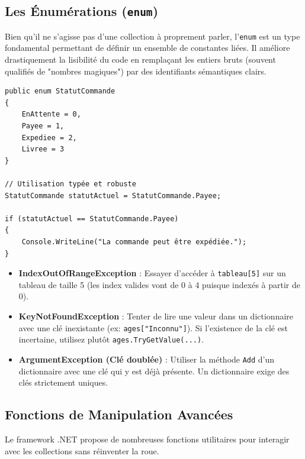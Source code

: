 \subsection{Les Énumérations (\texttt{enum})}
Bien qu'il ne s'agisse pas d'une collection à proprement parler, l'\texttt{enum} est un type fondamental permettant de définir un ensemble de constantes liées. Il améliore drastiquement la lisibilité du code en remplaçant les entiers bruts (souvent qualifiés de "nombres magiques") par des identifiants sémantiques clairs.

\begin{lstlisting}[style=csharpstyle]
public enum StatutCommande
{
    EnAttente = 0,
    Payee = 1,
    Expediee = 2,
    Livree = 3
}

// Utilisation typée et robuste
StatutCommande statutActuel = StatutCommande.Payee;

if (statutActuel == StatutCommande.Payee)
{
    Console.WriteLine("La commande peut être expédiée.");
}
\end{lstlisting}

\begin{tcolorbox}[colback=backcolour,colframe=keywordcolor,title=\textbf{Pièges Courants \& Erreurs}]
\begin{itemize}
    \item \textbf{IndexOutOfRangeException} : Essayer d'accéder à \texttt{tableau[5]} sur un tableau de taille 5 (les index valides vont de 0 à 4 puisque indexés à partir de 0).
    \item \textbf{KeyNotFoundException} : Tenter de lire une valeur dans un dictionnaire avec une clé inexistante (ex: \texttt{ages["Inconnu"]}). Si l'existence de la clé est incertaine, utilisez plutôt \texttt{ages.TryGetValue(...)}.
    \item \textbf{ArgumentException (Clé doublée)} : Utiliser la méthode \texttt{Add} d'un dictionnaire avec une clé qui y est déjà présente. Un dictionnaire exige des clés strictement uniques.
\end{itemize}
\end{tcolorbox}

\subsection{Fonctions de Manipulation Avancées}

Le framework .NET propose de nombreuses fonctions utilitaires pour interagir avec les collections sans réinventer la roue.

